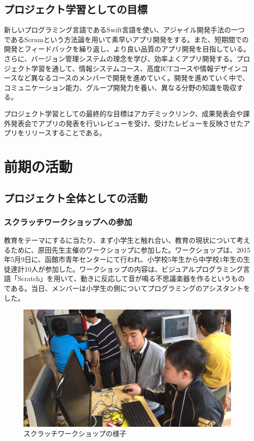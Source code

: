 \documentclass[openany,11pt,papersize]{jsbook}
\begin{document}
\section{プロジェクト学習としての目標}
新しいプログラミング言語であるSwift言語を使い、アジャイル開発手法の一つであるScrumという方法論を用いて素早いアプリ開発をする。また、短期間での開発とフィードバックを繰り返し、より良い品質のアプリ開発を目指している。さらに、バージョン管理システムの理念を学び、効率よくアプリ開発する。プロジェクト学習を通して、情報システムコース、高度ICTコースや情報デザインコースなど異なるコースのメンバーで開発を進めていく。開発を進めていく中で、コミュニケーション能力、グループ開発力を養い、異なる分野の知識を吸収する。
\par
プロジェクト学習としての最終的な目標はアカデミックリンク、成果発表会や課外発表会でアプリの発表を行いレビューを受け、受けたレビューを反映させたアプリをリリースすることである。

\chapter{前期の活動}

\section{プロジェクト全体としての活動}

\subsection{スクラッチワークショップへの参加}
\par 教育をテーマにするに当たり、まず小学生と触れ合い、教育の現状について考えるために、原田先生主催のワークショップに参加した。ワークショップは、2015年5月9日に、函館市青年センターにて行われ、小学校5年生から中学校1年生の生徒達計10人が参加した。ワークショップの内容は、ビジュアルプログラミング言語「Scratch」を用いて、動きに反応して音が鳴る不思議楽器を作るというものである。当日、メンバーは小学生の側についてプログラミングのアシスタントをした。

\begin{figure}[H]
\begin{center}
\includegraphics[width=14cm, bb=0 0 1920 1080]{img/20150509_workshop.jpg}
\end{center}
\caption{スクラッチワークショップの様子}
\end{figure}
\end{document}
